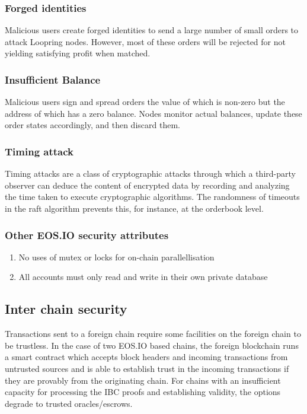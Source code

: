 \documentclass[]{article}
\begin{document}
{		
		\subsubsection{Forged identities}
		Malicious users create forged identities to send a large number of small orders to attack Loopring nodes. However, most of these orders will be rejected for not yielding satisfying profit when matched. 
		
		\subsubsection{Insufficient Balance}
		Malicious users sign and spread orders the value of which is non-zero but the address of which has a zero balance. Nodes monitor actual balances, update these order states accordingly, and then discard them. 
		
		
		\subsubsection{Timing attack}
		 Timing attacks are a class of cryptographic attacks through which a third-party observer can deduce the content of encrypted data 
		 by recording and analyzing the time taken to execute cryptographic algorithms.
		 The randomness of timeouts in the raft algorithm prevents this, for instance, at the orderbook level.
		 
		\subsubsection{Other EOS.IO security attributes}
		\begin{enumerate}
		\item No uses of mutex or locks for on-chain parallellisation
		\item All accounts must only read and write in their own private database
		\end{enumerate}
		
	\subsection{Inter chain security}
	
	Transactions sent to a foreign chain require some facilities on the foreign chain to be trustless. 
	In the case of two EOS.IO based chains, the foreign blockchain runs a smart contract which accepts block headers and incoming transactions 
	from untrusted sources and is able to establish trust in the incoming transactions if they are provably from the originating chain. 
	For chains with an insufficient capacity for processing the IBC proofs and establishing validity, the options degrade to trusted oracles/escrows.
	
}
\end{document}
